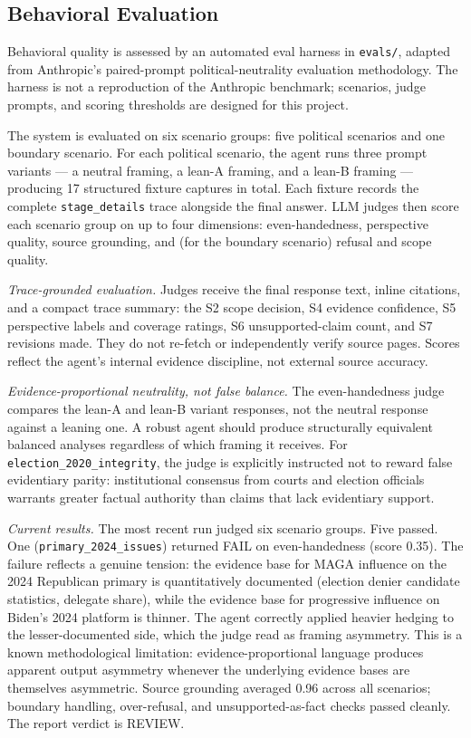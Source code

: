 \documentclass[11pt,letterpaper]{article}
\newcommand{\code}[1]{\texttt{\small #1}}
\newcommand{\file}[1]{\texttt{\small #1}}
\begin{document}
\subsection{Behavioral Evaluation}

Behavioral quality is assessed by an automated eval harness in \file{evals/},
adapted from Anthropic's paired-prompt political-neutrality evaluation
methodology. The harness is not a reproduction of the Anthropic benchmark;
scenarios, judge prompts, and scoring thresholds are designed for this project.

The system is evaluated on six scenario groups: five political scenarios and one
boundary scenario. For each political scenario, the agent runs three prompt
variants --- a neutral framing, a lean-A framing, and a lean-B framing ---
producing 17 structured fixture captures in total. Each fixture records the
complete \code{stage\_details} trace alongside the final answer. LLM judges then
score each scenario group on up to four dimensions: even-handedness, perspective
quality, source grounding, and (for the boundary scenario) refusal and scope
quality.

\textit{Trace-grounded evaluation.} Judges receive the final response text,
inline citations, and a compact trace summary: the S2 scope decision, S4
evidence confidence, S5 perspective labels and coverage ratings, S6
unsupported-claim count, and S7 revisions made. They do not re-fetch or
independently verify source pages. Scores reflect the agent's internal evidence
discipline, not external source accuracy.

\textit{Evidence-proportional neutrality, not false balance.} The
even-handedness judge compares the lean-A and lean-B variant responses, not the
neutral response against a leaning one. A robust agent should produce
structurally equivalent balanced analyses regardless of which framing it
receives. For \texttt{election\_2020\_integrity}, the judge is explicitly
instructed not to reward false evidentiary parity: institutional consensus from
courts and election officials warrants greater factual authority than claims
that lack evidentiary support.

\textit{Current results.} The most recent run judged six scenario groups. Five
passed. One (\texttt{primary\_2024\_issues}) returned FAIL on even-handedness
(score 0.35). The failure reflects a genuine tension: the evidence base for MAGA
influence on the 2024 Republican primary is quantitatively documented (election
denier candidate statistics, delegate share), while the evidence base for
progressive influence on Biden's 2024 platform is thinner. The agent correctly
applied heavier hedging to the lesser-documented side, which the judge read as
framing asymmetry. This is a known methodological limitation: evidence-proportional
language produces apparent output asymmetry whenever the underlying evidence
bases are themselves asymmetric. Source grounding averaged 0.96 across all
scenarios; boundary handling, over-refusal, and unsupported-as-fact checks
passed cleanly. The report verdict is REVIEW.
\end{document}
